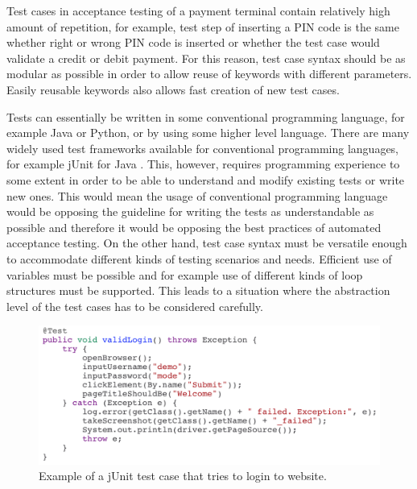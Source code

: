 Test cases in acceptance testing of a payment terminal contain relatively high amount of repetition, for example, test step of inserting a PIN code is the same whether right or wrong PIN code is inserted or whether the test case would validate a credit or debit payment. For this reason, test case syntax should be as modular as possible in order to allow reuse of keywords with different parameters. Easily reusable keywords also allows fast creation of new test cases.

Tests can essentially be written in some conventional programming language, for example Java or Python, or by using some higher level language. There are many widely used test frameworks available for conventional programming languages, for example jUnit for Java \citep{junit}. This, however, requires programming experience to some extent in order to be able to understand and modify existing tests or write new ones. This would mean the usage of conventional programming language would be opposing the guideline for writing the tests as understandable as possible and therefore it would be opposing the best practices of automated acceptance testing. On the other hand, test case syntax must be versatile enough to accommodate different kinds of testing scenarios and needs. Efficient use of variables must be possible and for example use of different kinds of loop structures must be supported. This leads to a situation where the abstraction level of the test cases has to be considered carefully.

\begin{figure}[ht]
  \begin{center}
    \includegraphics[width=\textwidth]{images/junit_example.png}
    \caption{Example of a jUnit test case that tries to login to website.}
    \label{fig:junit}
  \end{center}
\end{figure}
\FloatBarrier

